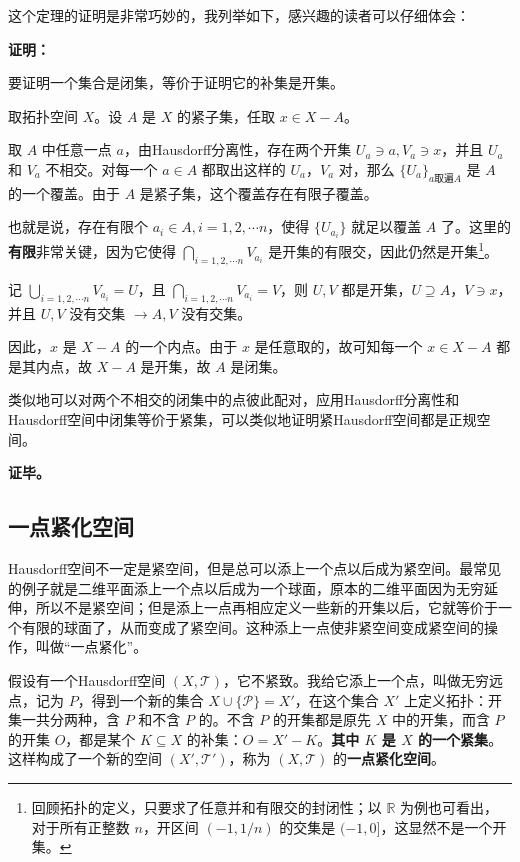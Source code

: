 这个定理的证明是非常巧妙的，我列举如下，感兴趣的读者可以仔细体会：

\textbf{证明：}

要证明一个集合是闭集，等价于证明它的补集是开集。

取拓扑空间 $X$。设 $A$ 是 $X$ 的紧子集，任取 $x\in X-A$。

取 $A$ 中任意一点 $a$，由Hausdorff分离性，存在两个开集 $U_a\ni a, V_a\ni x$，并且 $U_a$ 和 $V_a$ 不相交。对每一个 $a\in A$ 都取出这样的 $U_a$，$V_a$ 对，那么 $\{U_a\}_{a\text{取遍}A}$ 是 $A$ 的一个覆盖。由于 $A$ 是紧子集，这个覆盖存在有限子覆盖。

也就是说，存在有限个 $a_i\in A, i=1, 2, \cdots n$，使得 $\{U_{a_i}\}$ 就足以覆盖 $A$ 了。这里的\textbf{有限}非常关键，因为它使得 $\bigcap\limits_{i=1,2, \cdots n}V_{a_i}$ 是开集的有限交，因此仍然是开集\footnote{回顾拓扑的定义，只要求了任意并和有限交的封闭性；以 $\mathbb{R}$ 为例也可看出，对于所有正整数 $n$，开区间 $(-1,1/n)$ 的交集是 $(-1, 0]$，这显然不是一个开集。}。

记 $\bigcup\limits_{i=1,2, \cdots n}V_{a_i}=U$，且 $\bigcap\limits_{i=1,2, \cdots n}V_{a_i}=V$，则 $U, V$ 都是开集，$U\supseteq A$，$V\ni x$，并且 $U, V$ 没有交集 $\rightarrow A, V$ 没有交集。

因此，$x$ 是 $X-A$ 的一个内点。由于 $x$ 是任意取的，故可知每一个 $x\in X-A$ 都是其内点，故 $X-A$ 是开集，故 $A$ 是闭集。

类似地可以对两个不相交的闭集中的点彼此配对，应用Hausdorff分离性和Hausdorff空间中闭集等价于紧集，可以类似地证明紧Hausdorff空间都是正规空间。


\textbf{证毕。}

\subsection{一点紧化空间}

Hausdorff空间不一定是紧空间，但是总可以添上一个点以后成为紧空间。最常见的例子就是二维平面添上一个点以后成为一个球面，原本的二维平面因为无穷延伸，所以不是紧空间；但是添上一点再相应定义一些新的开集以后，它就等价于一个有限的球面了，从而变成了紧空间。这种添上一点使非紧空间变成紧空间的操作，叫做“一点紧化”。

假设有一个Hausdorff空间 $(X, \mathcal{T})$，它不紧致。我给它添上一个点，叫做无穷远点，记为 $P$，得到一个新的集合 $X\cup \{\mathcal{P}\}=X'$，在这个集合 $X'$ 上定义拓扑：开集一共分两种，含 $P$ 和不含 $P$ 的。不含 $P$ 的开集都是原先 $X$ 中的开集，而含 $P$ 的开集 $O$，都是某个 $K\subseteq X$ 的补集：$O=X'-K$。\textbf{其中 $K$ 是 $X$ 的一个紧集}。这样构成了一个新的空间 $(X', \mathcal{T}')$，称为 $(X, \mathcal{T})$ 的\textbf{一点紧化空间}。

